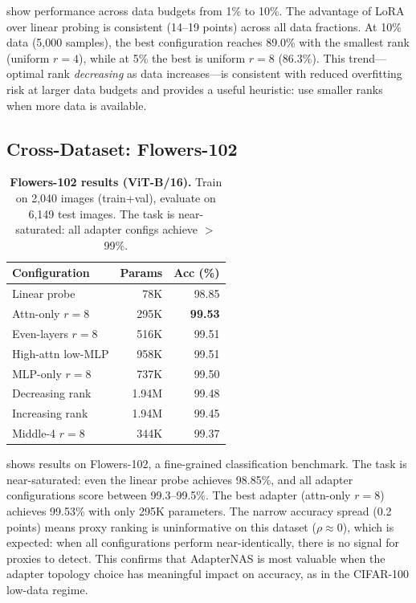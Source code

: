 \documentclass[10pt,twocolumn,letterpaper]{article}
\newcommand{\method}{AdapterNAS\xspace}
\begin{document}
 show performance across data budgets from 1\% to 10\%. The advantage of LoRA over linear probing is consistent (14--19 points) across all data fractions. At 10\% data (5,000 samples), the best configuration reaches 89.0\% with the smallest rank (uniform $r{=}4$), while at 5\% the best is uniform $r{=}8$ (86.3\%). This trend---optimal rank \emph{decreasing} as data increases---is consistent with reduced overfitting risk at larger data budgets and provides a useful heuristic: use smaller ranks when more data is available.

\subsection{Cross-Dataset: Flowers-102}

\begin{table}[t]
\centering
\caption{\textbf{Flowers-102 results (ViT-B/16).} Train on 2,040 images (train+val), evaluate on 6,149 test images. The task is near-saturated: all adapter configs achieve $>$99\%.}
\label{tab:flowers}
\small
\begin{tabular}{@{}lrr@{}}
\toprule
Configuration & Params & Acc (\%) \\
\midrule
Linear probe & 78K & 98.85 \\
\midrule
Attn-only $r{=}8$ & 295K & \textbf{99.53} \\
Even-layers $r{=}8$ & 516K & 99.51 \\
High-attn low-MLP & 958K & 99.51 \\
MLP-only $r{=}8$ & 737K & 99.50 \\
Decreasing rank & 1.94M & 99.48 \\
Increasing rank & 1.94M & 99.45 \\
Middle-4 $r{=}8$ & 344K & 99.37 \\
\bottomrule
\end{tabular}
\end{table}

 shows results on Flowers-102, a fine-grained classification benchmark. The task is near-saturated: even the linear probe achieves 98.85\%, and all adapter configurations score between 99.3--99.5\%. The best adapter (attn-only $r{=}8$) achieves 99.53\% with only 295K parameters. The narrow accuracy spread (0.2 points) means proxy ranking is uninformative on this dataset ($\rho \approx 0$), which is expected: when all configurations perform near-identically, there is no signal for proxies to detect. This confirms that \method is most valuable when the adapter topology choice has meaningful impact on accuracy, as in the CIFAR-100 low-data regime.
\end{document}
